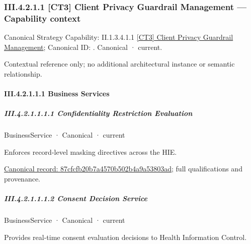 \subsubsection*{III.4.2.1.1 [CT3] Client Privacy Guardrail Management — Capability context}
\label{navigation:III.4.2.1.1}

{\small Canonical Strategy Capability: II.1.3.4.1.1 \hyperref[element:7577a6e1815243648dd5356c21cca151]{[CT3] Client Privacy Guardrail Management}; Canonical ID: \texttt{}. Canonical · current.}\par
Contextual reference only; no additional architectural instance or semantic relationship.\par
\paragraph*{III.4.2.1.1.1 Business Services}
\label{navigation:III.4.2.1.1.1}

\subparagraph*{III.4.2.1.1.1.1 Confidentiality Restriction Evaluation}
\label{navigation:III.4.2.1.1.1.1}

\label{element:87cfcfb20b7a4570b502b4a9a53803ad}
{\small BusinessService · Canonical · current}\par

Enforces record-level masking directives across the HIE.


{\footnotesize \href{../../../../continuum/business/business-service/87cfcfb20b7a4570b502b4a9a53803ad.md}{Canonical record: 87cfcfb20b7a4570b502b4a9a53803ad}; full qualifications and provenance.}\par
\subparagraph*{III.4.2.1.1.1.2 Consent Decision Service}
\label{navigation:III.4.2.1.1.1.2}

\label{element:e1bebefbdbef4a1981ec31341eb71dfd}
{\small BusinessService · Canonical · current}\par

Provides real-time consent evaluation decisions to Health Information Control.


